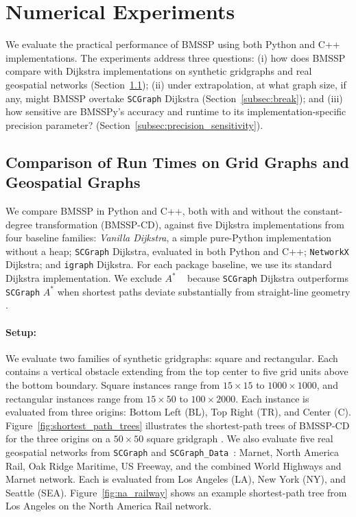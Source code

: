 \documentclass[ijoc,blindrev]{informs3} %
\begin{document}
{\color{blue}
\section{Numerical Experiments}\label{sec:num}
We evaluate the practical performance of BMSSP using both Python and C++ implementations. The experiments address three questions: (i) how does BMSSP compare with Dijkstra implementations on synthetic gridgraphs and real geospatial networks (Section~\ref{subsec:compar}); (ii) under extrapolation, at what graph size, if any, might BMSSP overtake \texttt{SCGraph} Dijkstra (Section~\ref{subsec:break}); and (iii) how sensitive are BMSSPy's accuracy and runtime to its implementation-specific precision parameter? (Section~\ref{subsec:precision_sensitivity}).



\subsection{Comparison of Run Times on Grid Graphs and Geospatial Graphs}\label{subsec:compar}
We compare BMSSP in Python and C++, both with and without the constant-degree transformation (BMSSP-CD), against five Dijkstra implementations from four baseline families: \emph{Vanilla Dijkstra}, a simple pure-Python implementation without a heap; \texttt{SCGraph} Dijkstra, evaluated in both Python and C++; \texttt{NetworkX} Dijkstra; and \texttt{igraph} Dijkstra. For each package baseline, we use its standard Dijkstra implementation. We exclude $A^*$ ~\citep{hart1968formal} because \texttt{SCGraph} Dijkstra outperforms \texttt{SCGraph} $A^*$ when shortest paths deviate substantially from straight-line geometry \citep{makowski2025scgraph}.

\paragraph{Setup:}
We evaluate two families of synthetic gridgraphs: square and rectangular. Each contains a vertical obstacle extending from the top center to five grid units above the bottom boundary. Square instances range from \(15\times15\) to \(1000\times1000\), and rectangular instances range from \(15\times50\) to \(100\times2000\). Each instance is evaluated from three origins: Bottom Left (BL), Top Right (TR), and Center (C). Figure~\ref{fig:shortest_path_trees} illustrates the shortest-path trees of BMSSP-CD for the three origins on a \(50\times50\) square gridgraph \citep{makowski2025scgraph}.
We also evaluate five real geospatial networks from \texttt{SCGraph} and \texttt{SCGraph\_Data}~\citep{makowski2025scgraph}: Marnet, North America Rail, Oak Ridge Maritime, US Freeway, and the combined World Highways and Marnet network. Each is evaluated from Los Angeles (LA), New York (NY), and Seattle (SEA). Figure~\ref{fig:na_railway} shows an example shortest-path tree from Los Angeles on the North America Rail network.


}
\end{document}

